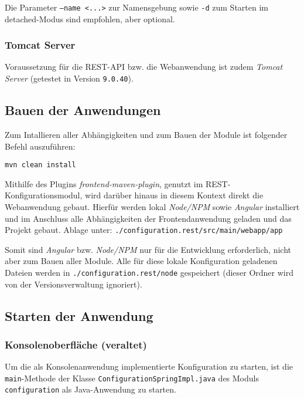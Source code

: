 Die Parameter \texttt{--name <...>} zur Namensgebung sowie \texttt{-d} zum Starten im detached-Modus sind empfohlen, aber optional.


\subsubsection{Tomcat Server}

Voraussetzung für die REST-API bzw. die Webanwendung ist zudem \textit{Tomcat Server} (getestet in Version \texttt{9.0.40}).

\subsection{Bauen der Anwendungen}\label{subsec:bauen-der-anwendungen}

Zum Intallieren aller Abhängigkeiten und zum Bauen der Module ist folgender Befehl auszuf\"uhren:

\begin{lstlisting}[label={lst:mvncleaninstall}]
mvn clean install
\end{lstlisting}

Mithilfe des Plugins \textit{frontend-maven-plugin}, genutzt im REST-Konfigurationsmodul, 
wird darüber hinaus in diesem Kontext direkt die Webanwendung gebaut.
Hierfür werden lokal \textit{Node/NPM} sowie \textit{Angular} installiert und
im Anschluss alle Abhängigkeiten der Frontendanwendung geladen und das Projekt gebaut. Ablage unter: 
\newline\texttt{./configuration.rest/src/main/webapp/app}

Somit sind \textit{Angular} bzw. \textit{Node/NPM} nur für die Entwicklung erforderlich, nicht aber zum Bauen aller Module. 
Alle für diese lokale Konfiguration geladenen Dateien werden in \texttt{./configuration.rest/node} gespeichert
(dieser Ordner wird von der Versionsverwaltung ignoriert).



\subsection{Starten der Anwendung}

\subsubsection{Konsolenoberfläche (veraltet)}

Um die als Konsolenanwendung implementierte Konfiguration zu starten, ist die \texttt{main}-Methode der 
Klasse \texttt{ConfigurationSpringImpl.java} des Moduls \texttt{configuration} als Java-Anwendung zu starten.

